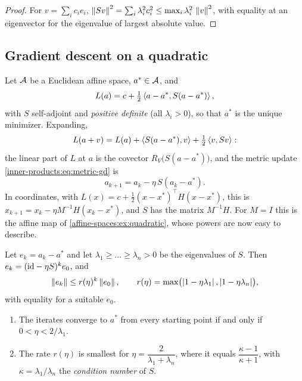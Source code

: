 \begin{notechapter}
\begin{proof}
For $v = \sum_ic_ie_i$, $\left\|Sv\right\|^2 = \sum_i\lambda_i^2c_i^2
\leq\max_i\lambda_i^2\,\left\|v\right\|^2$, with equality at an eigenvector for the
eigenvalue of largest absolute value.
\end{proof}

\subsection{Gradient descent on a quadratic}

Let $\mathcal{A}$ be a Euclidean affine space, $a^*\in\mathcal{A}$, and
\begin{equation}\label{spectral-svd:eq:quadratic}
  L(a) = c + \tfrac12\left\langle a - a^*, S(a - a^*) \right\rangle ,
\end{equation}
with $S$ self-adjoint and \emph{positive definite} (all
$\lambda_i > 0$), so that $a^*$ is the unique minimizer. Expanding,
\[
  L(a + v) = L(a) + \left\langle S(a - a^*), v \right\rangle + \tfrac12\left\langle v, Sv \right\rangle :
\]
the linear part of $L$ at $a$ is the covector $R_V\bigl(S(a - a^*)\bigr)$,
and the metric update \eqref{inner-products:eq:metric-gd} is
\[
  a_{k+1} = a_k - \eta\,S(a_k - a^*) .
\]
In coordinates, with $L(x) = c + \frac12(x - x^*)^\top H(x - x^*)$, this is
$x_{k+1} = x_k - \eta M^{-1}H(x_k - x^*)$, and $S$ has the matrix
$M^{-1}H$. For $M = I$ this is the affine map of
\cref{affine-spaces:ex:quadratic}, whose powers are now easy to describe.

\begin{theorem}\label{spectral-svd:thm:gd}
Let $e_k = a_k - a^*$ and let $\lambda_1\geq\dots\geq\lambda_n > 0$ be the
eigenvalues of $S$. Then $e_k = (\mathrm{id} - \eta S)^ke_0$, and
\[
  \left\|e_k\right\|\leq r(\eta)^k\left\|e_0\right\| ,
  \qquad
  r(\eta) = \max\bigl(\left|1 - \eta\lambda_1\right|, \left|1 - \eta\lambda_n\right|\bigr) ,
\]
with equality for a suitable $e_0$.
\begin{enumerate}[nosep]
  \item The iterates converge to $a^*$ from every starting point if and
        only if $0 < \eta < 2/\lambda_1$.
  \item The rate $r(\eta)$ is smallest for
        $\eta = \dfrac2{\lambda_1 + \lambda_n}$, where it equals
        $\dfrac{\kappa - 1}{\kappa + 1}$, with
        $\kappa = \lambda_1/\lambda_n$ the \emph{condition number} of $S$.
\end{enumerate}
\end{theorem}


\end{notechapter}
